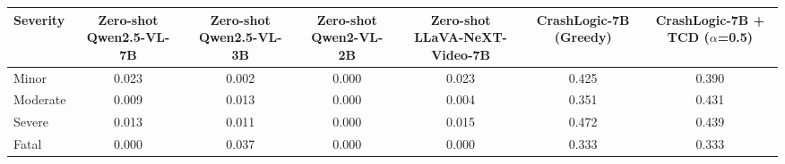 \begin{tabular}{lcccccc}
\toprule
Severity & Zero-shot Qwen2.5-VL-7B & Zero-shot Qwen2.5-VL-3B & Zero-shot Qwen2-VL-2B & Zero-shot LLaVA-NeXT-Video-7B & CrashLogic-7B (Greedy) & CrashLogic-7B + TCD ($\alpha$=0.5) \\
\midrule
Minor & 0.023 & 0.002 & 0.000 & 0.023 & 0.425 & 0.390 \\
Moderate & 0.009 & 0.013 & 0.000 & 0.004 & 0.351 & 0.431 \\
Severe & 0.013 & 0.011 & 0.000 & 0.015 & 0.472 & 0.439 \\
Fatal & 0.000 & 0.037 & 0.000 & 0.000 & 0.333 & 0.333 \\
\bottomrule
\end{tabular}
